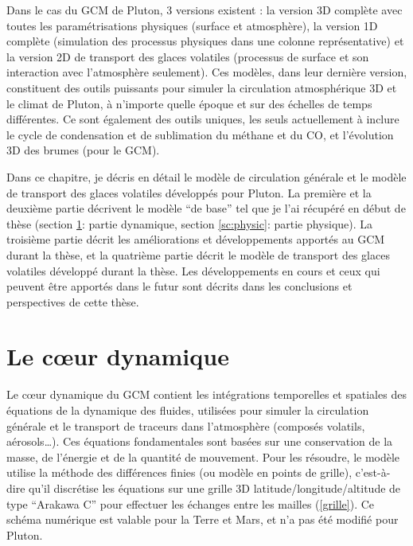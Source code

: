 Dans le cas du GCM de Pluton, 3 versions existent : la version 3D complète avec toutes les paramétrisations physiques (surface et atmosphère), la version 1D complète (simulation des processus physiques dans une colonne représentative) et la version 2D de transport des glaces volatiles (processus de surface et son interaction avec l’atmosphère seulement).
Ces modèles, dans leur dernière version, constituent des outils puissants pour simuler la circulation atmosphérique 3D et le climat de Pluton, à n’importe quelle époque et sur des échelles de temps différentes. Ce sont également des outils uniques, les seuls actuellement à inclure le cycle de condensation et de sublimation du méthane et du CO, et l’évolution 3D des brumes (pour le GCM). 

\vspace{0.5cm}

Dans ce chapitre, je décris en détail le modèle de circulation générale et le modèle de transport des glaces volatiles développés pour Pluton. La première et la deuxième partie décrivent le modèle “de base” tel que je l’ai récupéré en début de thèse (section \ref{sc:dynamic}: partie dynamique, section \ref{sc:physic}: partie physique). La troisième partie décrit les améliorations et développements apportés au GCM durant la thèse, et la quatrième partie décrit le modèle de transport des glaces volatiles développé durant la thèse. 
Les développements en cours et ceux qui peuvent être apportés dans le futur sont décrits dans les conclusions et perspectives de cette thèse. 


\section{Le cœur dynamique}
\label{sc:dynamic}

Le cœur dynamique du GCM contient les intégrations temporelles et spatiales des équations de la dynamique des fluides, utilisées pour simuler la circulation générale et le transport de traceurs dans l’atmosphère (composés volatils, aérosols…). Ces équations fondamentales sont basées sur une conservation de la masse, de l’énergie et de la quantité de mouvement. Pour les résoudre, le modèle utilise la méthode des différences finies (ou modèle en points de grille), c’est-à-dire qu’il discrétise les équations sur une grille 3D latitude/longitude/altitude de type “Arakawa C” \citep{ArakLamb:77}  pour effectuer les échanges entre les mailles (\autoref{grille}). Ce schéma numérique est valable pour la Terre et Mars, et n’a pas été modifié pour Pluton. 

